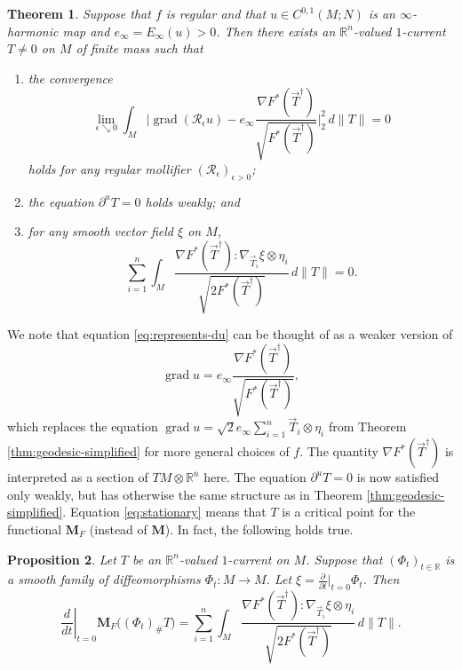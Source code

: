 \documentclass[a4paper]{article}
\newcommand{\R}{\mathbb{R}}
\newcommand{\M}{\mathbf{M}}
\newcommand{\ndim}{{\bar{n}}}
\DeclareMathOperator{\grad}{grad}
\newcommand{\dd}[2]{\frac{\partial #1}{\partial #2}}
\newtheorem{theorem}{Theorem}
\newtheorem{proposition}[theorem]{Proposition}
\theoremstyle{definition}
\theoremstyle{remark}
\begin{document}
\begin{theorem} \label{thm:geodesic}
Suppose that $f$ is regular and that $u \in C^{0, 1}(M; N)$ is an $\infty$-harmonic map and $e_\infty = E_\infty(u) > 0$.
Then there exists an $\R^n$-valued $1$-current $T \neq 0$ on $M$ of finite mass such that
\begin{enumerate}
\item \label{itm:identity-for-du} the convergence
\begin{equation} \label{eq:represents-du}
\lim_{\epsilon \searrow 0} \int_M \biggl|\grad(\mathcal{R}_\epsilon u) - e_\infty \frac{\nabla F^*(\vec{T}^\dagger)}{\sqrt{F^*(\vec{T}^\dagger)}}\biggr|_2^2 \, d\|T\| = 0
\end{equation}
holds for any regular mollifier $(\mathcal{R}_\epsilon)_{\epsilon > 0}$;
\item \label{itm:boundary-vanishes} the equation $\partial^u T = 0$ holds weakly; and
\item for any smooth vector field $\xi$ on $M$,
\begin{equation} \label{eq:stationary}
\sum_{i = 1}^n \int_M \frac{\nabla F^*(\vec{T}^\dagger) : \nabla_{\vec{T}_i} \xi \otimes \eta_i}{\sqrt{2F^*(\vec{T}^\dagger)}} \, d\|T\| = 0.
\end{equation}
\end{enumerate}
\end{theorem}

We note that equation \eqref{eq:represents-du} can be thought of as a weaker version of
\begin{equation} \label{eq:pointwise-equation-for-du}
\grad u = e_\infty \frac{\nabla F^*(\vec{T}^\dagger)}{\sqrt{F^*(\vec{T}^\dagger)}},
\end{equation}
which replaces the equation $\grad u = \sqrt{2} e_\infty \sum_{i = 1}^n \vec{T}_i \otimes \eta_i$ from Theorem \ref{thm:geodesic-simplified} for more general choices of $f$. The quantity
$\nabla F^*(\vec{T}^\dagger)$ is interpreted as a section of $TM \otimes \R^\ndim$ here. The equation
$\partial^u T = 0$ is now satisfied only weakly, but has otherwise the same structure as in Theorem \ref{thm:geodesic-simplified}.
Equation \eqref{eq:stationary} means that $T$ is a critical point for the functional $\M_F$ (instead of $\M$). In fact, the following holds true.

\begin{proposition} \label{prp:first-variation-of-mass}
Let $T$ be an $\R^n$-valued $1$-current on $M$. Suppose that $(\Phi_t)_{t \in \R}$ is a smooth family of diffeomorphisms $\Phi_t \colon M \to M$. Let
$\xi = \dd{}{t}|_{t = 0} \Phi_t$.
Then
\[
\left.\frac{d}{dt}\right|_{t = 0} \M_F\bigl((\Phi_t)_\# T\bigr) = \sum_{i = 1}^n \int_M \frac{\nabla F^*(\vec{T}^\dagger) : \nabla_{\vec{T}_i} \xi \otimes \eta_i}{\sqrt{2F^*(\vec{T}^\dagger)}} \, d\|T\|.
\]
\end{proposition}
\end{document}
